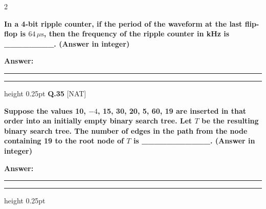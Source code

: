\documentclass[a4paper,10pt,twoside]{article}
\begin{document}
\begin{multicols}{2}
\par\vspace{2pt}
{\bfseries In a 4-bit ripple counter, if the period of the waveform at the last flip-flop is $64\,\mu\text{s}$, then the frequency of the ripple counter in kHz is \_\_\_\_\_\_\_\_. (Answer in integer) \par}
\par\vspace{3pt}\noindent\textbf{Answer:} \rule{3.2cm}{0.4pt}
\par\vspace{6pt}\hrule height 0.25pt\vspace{6pt}
\noindent\textbf{Q.35} \hfill {\footnotesize\textsf{[NAT]}}
\par\vspace{2pt}
{\bfseries Suppose the values 10, $-4$, 15, 30, 20, 5, 60, 19 are inserted in that order into an initially empty binary search tree. Let $T$ be the resulting binary search tree. The number of edges in the path from the node containing 19 to the root node of $T$ is \_\_\_\_\_\_\_\_\_\_\_. (Answer in integer) \par}
\par\vspace{3pt}\noindent\textbf{Answer:} \rule{3.2cm}{0.4pt}
\par\vspace{6pt}\hrule height 0.25pt\vspace{6pt}

\vspace{6pt}
\vspace{3pt}


\end{multicols}
\end{document}
